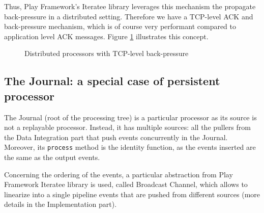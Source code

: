 Thus, Play Framework's Iteratee library leverages this mechanism the propagate back-pressure in a distributed setting. Therefore we have a TCP-level ACK and back-pressure mechanism, which is of course very performant compared to application level ACK messages. Figure \ref{fig:tcpbackpressure} illustrates this concept.

\begin{figure}[h]
  \begin{center} 
    \caption{Distributed processors with TCP-level back-pressure}
    \label{fig:tcpbackpressure}
  \end{center}
\end{figure}


\subsection{The Journal: a special case of persistent processor}

The Journal (root of the processing tree) is a particular processor as its source is not a replayable processor. Instead, it has multiple sources: all the pullers from the Data
Integration part that push events concurrently in the Journal. Moreover, its \verb|process| method is the identity function, as the events inserted are the same as the output events.

Concerning the ordering of the events, a particular abstraction from Play Framework Iteratee library is used, called Broadcast Channel, which allows to linearize into a single pipeline events that are pushed from different sources (more details in the Implementation part).

